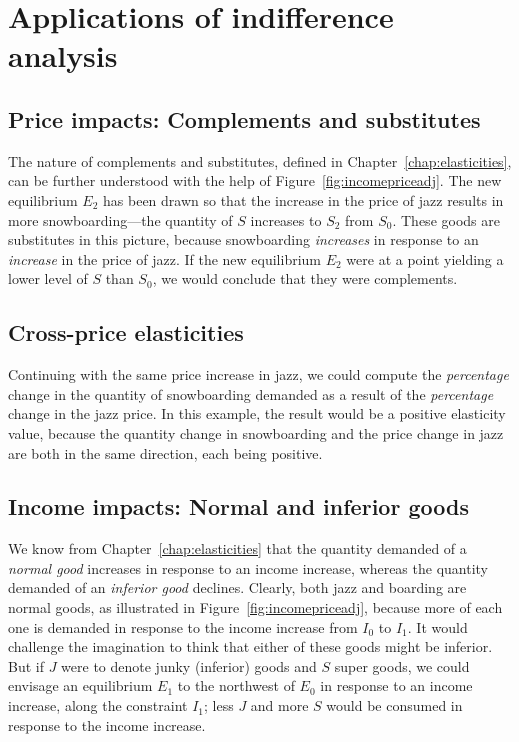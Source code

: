 \section{Applications of indifference analysis}\label{sec:ch6sec4}

\subsection*{Price impacts: Complements and substitutes}

The nature of complements and substitutes, defined in Chapter~\ref{chap:elasticities},
can be further understood with the help of Figure~\ref{fig:incomepriceadj}.
The new equilibrium $E_2$ has been drawn so that the
increase in the price of jazz results in more snowboarding---the quantity of 
$S$ increases to $S_2$ from $S_0$. These goods are substitutes in this
picture, because snowboarding \textit{increases} in response to an \textit{%
	increase} in the price of jazz. If the new equilibrium $E_2$ were at a point
yielding a lower level of $S$ than $S_0$, we would conclude that they were
complements.

\subsection*{Cross-price elasticities}

Continuing with the same price increase in jazz, we could compute the 
\textit{percentage} change in the quantity of snowboarding demanded as a
result of the \textit{percentage} change in the jazz price. In this example,
the result would be a positive elasticity value, because the quantity change
in snowboarding and the price change in jazz are both in the same direction,
each being positive.

\subsection*{Income impacts: Normal and inferior goods}

We know from Chapter~\ref{chap:elasticities} that the quantity demanded of a 
\textit{normal good} increases in response to an income increase, whereas
the quantity demanded of an \textit{inferior good} declines. Clearly, both
jazz and boarding are normal goods, as illustrated in Figure~\ref{fig:incomepriceadj},
because more of each one is demanded in response to
the income increase from $I_{0}$ to $I_{1}$. It would challenge the
imagination to think that either of these goods might be inferior. But if $J$
were to denote junky (inferior) goods and $S$ super goods, we could
envisage an equilibrium $E_{1}$ to the northwest of $E_{0}$ in response to
an income increase, along the constraint $I_{1}$; less $J$ and more $S$
would be consumed in response to the income increase.

